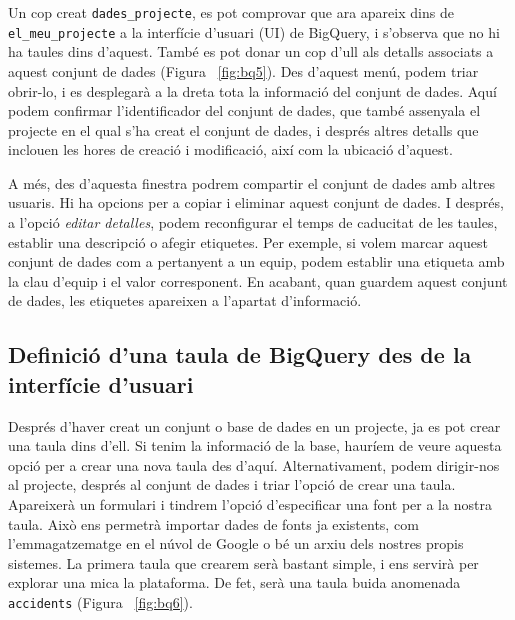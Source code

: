 \documentclass[11pt,longbibliography]{article}
\theoremstyle{definition}
\theoremstyle{remark}
\begin{document}
Un cop creat \verb|dades_projecte|, es pot comprovar que ara apareix dins de \verb|el_meu_projecte| a la interfície d'usuari (UI) de BigQuery, i s'observa que no hi ha taules dins d'aquest. També es pot donar un cop d'ull als detalls associats a aquest conjunt de dades (Figura ~\ref{fig:bq5}). Des d'aquest menú, podem triar obrir-lo, i es desplegarà a la dreta tota la informació del conjunt de dades. Aquí podem confirmar l'identificador del conjunt de dades, que també assenyala el projecte en el qual s'ha creat el conjunt de dades, i després altres detalls que inclouen les hores de creació i modificació, així com la ubicació d'aquest.



A més, des d'aquesta finestra podrem compartir el conjunt de dades amb altres usuaris. Hi ha opcions per a copiar i eliminar aquest conjunt de dades. I després, a l'opció \textit{editar detalles}, podem reconfigurar el temps de caducitat de les taules, establir una descripció o afegir etiquetes. Per exemple, si volem marcar aquest conjunt de dades com a pertanyent a un equip, podem establir una etiqueta amb la clau d'equip i el valor corresponent. En acabant, quan guardem aquest conjunt de dades, les etiquetes apareixen a l'apartat d'informació.

\subsection{Definició d'una taula de BigQuery des de la interfície d'usuari}

Després d'haver creat un conjunt o base de dades en un projecte, ja es pot crear una taula dins d'ell. Si tenim la informació de la base, hauríem de veure aquesta opció per a crear una nova taula des d'aquí. Alternativament, podem dirigir-nos al projecte, després al conjunt de dades i triar l'opció de crear una taula. Apareixerà un formulari i tindrem l'opció d'especificar una font per a la nostra taula. Això ens permetrà importar dades de fonts ja existents, com l'emmagatzematge en el núvol de Google o bé un arxiu dels nostres propis sistemes. La primera taula que crearem serà bastant simple, i ens servirà per explorar una mica la plataforma. De fet, serà una taula buida anomenada \verb|accidents| (Figura ~\ref{fig:bq6}). 
\end{document}
